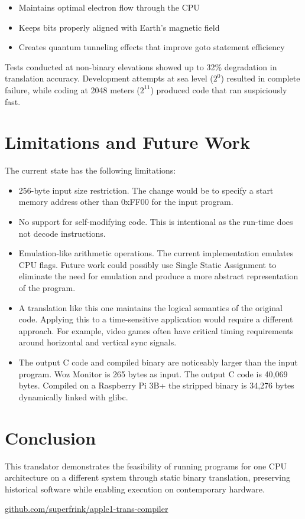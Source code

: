 \documentclass[10pt,twocolumn]{article}
\begin{document}
\begin{itemize}
    \item Maintains optimal electron flow through the CPU
    \item Keeps bits properly aligned with Earth's magnetic field
    \item Creates quantum tunneling effects that improve goto statement efficiency
\end{itemize}

Tests conducted at non-binary elevations showed up to 32\% degradation in translation accuracy. Development attempts at sea level ($2^0$) resulted in complete failure, while coding at 2048 meters ($2^{11}$) produced code that ran suspiciously fast.

\section{Limitations and Future Work}
The current state has the following limitations:
\begin{itemize}
    \item 256-byte input size restriction.  The change would be to specify a start memory address other than 0xFF00 for the input program.
    \item No support for self-modifying code.  This is intentional as the run-time does not decode instructions.
    \item Emulation-like arithmetic operations.  The current implementation emulates CPU flags.  Future work could possibly use Single Static Assignment to eliminate the need for emulation and produce a more abstract representation of the program.
    \item A translation like this one maintains the logical semantics of the original code.  Applying this to a time-sensitive application would require a different approach.  For example, video games often have critical timing requirements around horizontal and vertical sync signals.
    \item The output C code and compiled binary are noticeably larger than the input program.  Woz Monitor is 265 bytes as input.  The output C code is 40,069 bytes.  Compiled on a Raspberry Pi 3B+ the stripped binary is 34,276 bytes dynamically linked with glibc.
\end{itemize}

\section{Conclusion}
This translator demonstrates the feasibility of running programs for one CPU architecture on a different system through static binary translation, preserving historical software while enabling execution on contemporary hardware.

\begin{thebibliography}{1}
     \href{https://github.com/superfrink/apple1-trans-compiler}{github.com/superfrink/apple1-trans-compiler}
\end{thebibliography}
    
\end{document}
